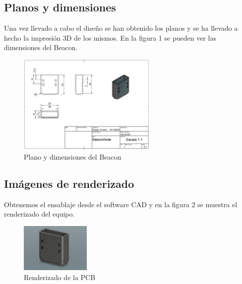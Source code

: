 \documentclass[paper=a4, fontsize=11pt,twoside]{scrartcl}
\begin{document}
    \subsection{Planos y dimensiones}
        Una vez llevado a cabo el diseño se han obtenido los planos y se ha llevado a hecho la impresión 3D de los mismos. En la figura 1 
        se pueden ver las dimensiones del Beacon.
        \begin{center}
            \begin{figure}[h]
                \centering
                \includegraphics[width=0.6\textwidth]{../model_beacon.PNG}
                \caption{Plano y dimensiones del Beacon}
                \label{fig:mesh1}
            \end{figure}
        \end{center}
    \subsection{Imágenes de renderizado}
        Obtenemos el ensablaje desde el software CAD y en la figura 2 se muestra el renderizado del equipo.
        \begin{center}
            \begin{figure}[t]
                \centering
                \includegraphics[width=0.3\textwidth]{../mechanical_beacon.PNG}
                \caption{Renderizado de la PCB}
                \label{fig:mesh1}
            \end{figure}
        \end{center}
\end{document}

